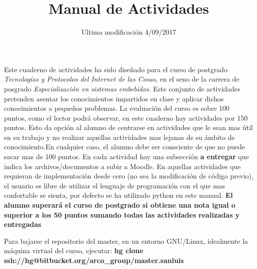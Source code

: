 \documentclass[english]{arco-report}
\title{Manual de Actividades}
\date{Ultima modificación 4/09/2017}
\begin{document}
\maketitle
Este cuaderno de actividades ha sido diseñado para el curso de postgrado \emph{Tecnologías y Protocolos del Internet de las Cosas}, en el seno de  la carrera de posgrado \emph{Especialización en sistemas embebidos}. Este conjunto de actividades pretenden asentar los conocimientos impartidos en clase y aplicar dichos conocimientos a pequeños problemas. La evaluación del curso es sobre 100 puntos, como el lector podrá observar, en este cuaderno hay actividades por 150 puntos. Esto da opción al alumno de centrarse en actividades que le sean mas útil en su trabajo y no realizar aquellas actividades mas lejanas de su ámbito de conocimiento.En cualquier caso, el alumno debe ser consciente de que no puede sacar mas de 100 puntos. En cada actividad hay una subsección \textbf{a entregar} que indica los archivos/documentos a subir a Moodle. En aquellas actividades que requieran de implementación desde cero (no sea la modificación de código previo), el usuario es libre de utilizar el lenguaje de programación con el que mas confortable se sienta, por defecto se ha utilizado python en este manual.
\textbf{El alumno superará el curso de postgrado si obtiene una nota igual o superior a los 50 puntos sumando todas las actividades realizadas y entregadas}

Para bajarse el repositorio del master, en un entorno GNU/Linux, idealmente la máquina virtual del curso, ejecutar:
\textbf{hg clone ssh://hg@bitbucket.org/arco\_group/master.sanluis}



%


%
%
%
\end{document}
